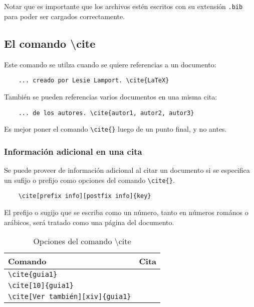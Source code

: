 \begin{lstlisting}
	
	
\end{lstlisting}

Notar que es importante que los archivos estén escritos con su extensión \verb|.bib| para poder ser cargados correctamente.

\subsection{El comando \textbackslash cite}

Este comando se utilza cuando se quiere referencias a un documento:
\begin{lstlisting}
	... creado por Lesie Lamport. \cite{LaTeX}
\end{lstlisting}

También se pueden referencias varios documentos en una misma cita:
\begin{lstlisting}
	... de los autores. \cite{autor1, autor2, autor3}
\end{lstlisting}

Es mejor poner el comando \verb|\cite{}| luego de un punto final, y no antes. 

\subsubsection{Información adicional en una cita}
Se puede proveer de información adicional al citar un documento si se especifica un sufijo o prefijo como opciones del comando \verb|\cite{}|. 
\begin{lstlisting}
	\cite[prefix info][postfix info]{key}
\end{lstlisting}

El prefijo o sugijo que se escriba como un número, tanto en números romános o arábicos, será tratado como una página del documento.

\begin{table}[h]
	\centering
	\caption{Opciones del comando \textbackslash cite{}}
	\begin{tabular}{ll}
		\toprule Comando				& Cita \\ 
		\midrule \verb|\cite{guia1}| 	& 	\cite{guia1} \\
		\verb|\cite[10]{guia1}| 	& 	\cite[10]{guia1} \\
		\verb|\cite[Ver también][xiv]{guia1}| 	& 	\cite[Ver también][xiv]{guia1} \\
		\bottomrule
	\end{tabular}
\end{table}

